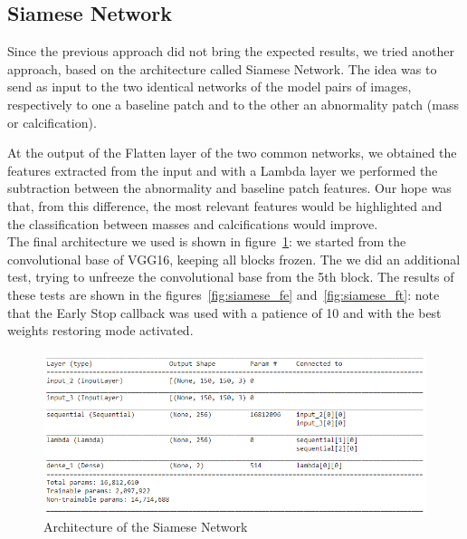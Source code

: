 \documentclass[11pt,a4paper,oneside]{article}
\begin{document}
\subsection{Siamese Network}
Since the previous approach did not bring the expected results, we tried another approach, based on the architecture called Siamese Network. The idea was to send as input to the two identical networks of the model pairs of images, respectively to one a baseline patch and to the other an abnormality patch (mass or calcification).

At the output of the Flatten layer of the two common networks, we obtained the features extracted from the input and with a Lambda layer we performed the subtraction between the abnormality and baseline patch features. Our hope was that, from this difference, the most relevant features would be highlighted and the classification between masses and calcifications would improve. \\
The final architecture we used is shown in figure~\ref{fig:siamese_model}: we started from the convolutional base of VGG16, keeping all blocks frozen. The we did an additional test, trying to unfreeze the convolutional base from the 5th block. The results of these tests are shown in the figures~\ref{fig:siamese_fe} and~\ref{fig:siamese_ft}: note that the Early Stop callback was used with a patience of 10 and with the best weights restoring mode activated.

\begin{figure}[h]
\centering
\includegraphics[width=.5\textwidth]{images/4.1/Siamese/Model}
\caption{Architecture of the Siamese Network}
\label{fig:siamese_model}
\end{figure}
\end{document}
